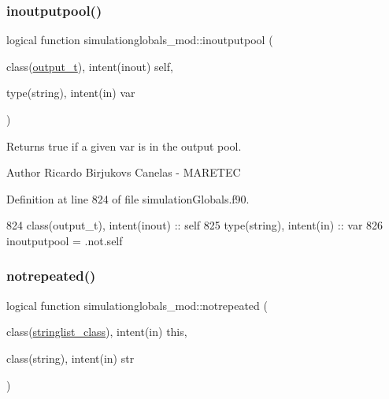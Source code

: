 \subsubsection{\texorpdfstring{inoutputpool()}{inoutputpool()}}
{\footnotesize\ttfamily logical function simulationglobals\+\_\+mod\+::inoutputpool (\begin{DoxyParamCaption}\item[{class(\mbox{\hyperlink{structsimulationglobals__mod_1_1output__t}{output\+\_\+t}}), intent(inout)}]{self,  }\item[{type(string), intent(in)}]{var }\end{DoxyParamCaption})\hspace{0.3cm}{\ttfamily [private]}}



Returns true if a given var is in the output pool. 

\begin{DoxyAuthor}{Author}
Ricardo Birjukovs Canelas -\/ M\+A\+R\+E\+T\+EC 
\end{DoxyAuthor}


Definition at line 824 of file simulation\+Globals.\+f90.


\begin{DoxyCode}
824     \textcolor{keywordtype}{class}(output\_t), \textcolor{keywordtype}{intent(inout)} :: self
825     \textcolor{keywordtype}{type}(string), \textcolor{keywordtype}{intent(in)} :: var
826     inoutputpool = .not.self%
\end{DoxyCode}
\mbox{\label{namespacesimulationglobals__mod_a12410ee549ead4c6d892dca6ead74d15}} 
\subsubsection{\texorpdfstring{notrepeated()}{notrepeated()}}
{\footnotesize\ttfamily logical function simulationglobals\+\_\+mod\+::notrepeated (\begin{DoxyParamCaption}\item[{class(\mbox{\hyperlink{structsimulationglobals__mod_1_1stringlist__class}{stringlist\+\_\+class}}), intent(in)}]{this,  }\item[{class(string), intent(in)}]{str }\end{DoxyParamCaption})\hspace{0.3cm}{\ttfamily [private]}}



